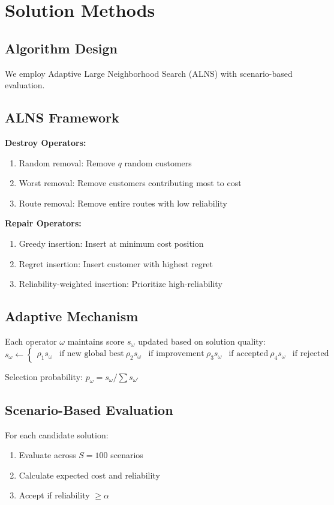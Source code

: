 \section{Solution Methods}

\subsection{Algorithm Design}

We employ Adaptive Large Neighborhood Search (ALNS) with scenario-based evaluation.

\subsection{ALNS Framework}

\textbf{Destroy Operators:}
\begin{enumerate}
\item Random removal: Remove $q$ random customers
\item Worst removal: Remove customers contributing most to cost
\item Route removal: Remove entire routes with low reliability
\end{enumerate}

\textbf{Repair Operators:}
\begin{enumerate}
\item Greedy insertion: Insert at minimum cost position
\item Regret insertion: Insert customer with highest regret
\item Reliability-weighted insertion: Prioritize high-reliability
\end{enumerate}

\subsection{Adaptive Mechanism}

Each operator $\omega$ maintains score $s_\omega$ updated based on solution quality:
\begin{equation}
s_\omega \leftarrow \begin{cases}
\rho_1 s_\omega & \text{if new global best} \
\rho_2 s_\omega & \text{if improvement} \
\rho_3 s_\omega & \text{if accepted} \
\rho_4 s_\omega & \text{if rejected}
\end{cases}
\end{equation}

Selection probability: $p_\omega = s_\omega / \sum s_{\omega'}$

\subsection{Scenario-Based Evaluation}

For each candidate solution:
\begin{enumerate}
\item Evaluate across $S = 100$ scenarios
\item Calculate expected cost and reliability
\item Accept if reliability $\geq \alpha$
\end{enumerate}

\label{sec:methods}
